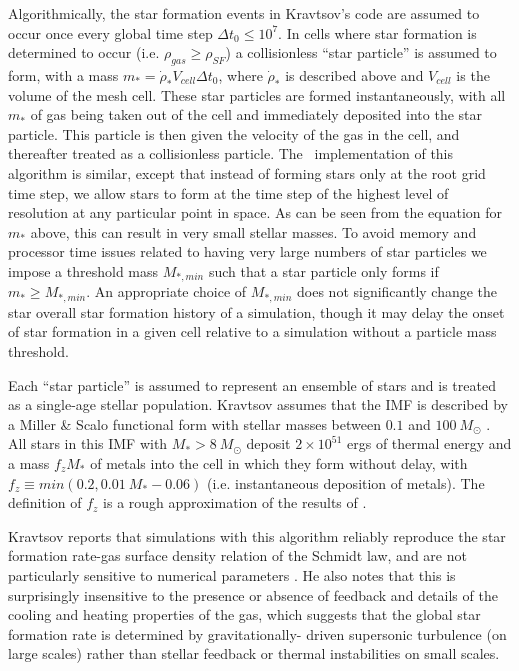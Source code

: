 Algorithmically, the star formation events in Kravtsov's code
are assumed to occur once every global time step 
$\Delta t_0 \leq 10^7$.  In cells where star formation is
determined to occur (i.e. $\rho_{gas} \geq \rho_{SF}$) a
collisionless ``star particle'' is assumed to form, with a 
mass $m_* = \dot{\rho}_* V_{cell} \Delta t_0$, where
$\dot{\rho}_*$ is described above and $V_{cell}$ is the 
volume of the mesh cell.  These star particles are
formed instantaneously, with all $m_*$ of gas being
taken out of the cell and immediately deposited into the
star particle.  This particle is then given the velocity
of the gas in the cell, and thereafter treated as a 
collisionless particle.  The \enzo\ implementation
of this algorithm is similar, except that instead of 
forming stars only at the root grid time step, we allow 
stars to form at the time step of the highest level of
resolution at any particular point in space.  As can be seen
from the equation for $m_*$ above, this can result in very 
small stellar masses.  To avoid memory and processor time
issues related to having very large numbers of star particles
we impose a threshold mass $M_{*,min}$ such that a star
particle only forms if $m_* \geq M_{*,min}$.  An
appropriate choice of $M_{*,min}$ does not significantly 
change the star overall star formation history of a 
simulation, though it may delay the onset of star formation 
in a given cell relative to a simulation without a particle mass
threshold.

Each ``star particle'' is assumed to represent an ensemble
of stars and is treated as a single-age stellar population.
Kravtsov assumes that the IMF is described by a
Miller \& Scalo functional form with stellar masses between
$0.1$ and $100~M_\odot$ \citep{1979ApJS...41..513M}.  All stars in this
IMF with $M_* > 8~M_\odot$ deposit $2 \times 10^{51}$ ergs of
thermal energy and a mass $f_z M_*$ of metals into the
cell in which they form without delay, with
$f_z \equiv min(0.2, 0.01~M_*-0.06)$ (i.e. instantaneous
deposition of metals).  The definition of $f_z$ is a rough
approximation of the results of 
\citet{1995ApJS..101..181W}.

Kravtsov reports that simulations with this algorithm
reliably reproduce the star formation rate-gas surface
density relation of the Schmidt law, and are not particularly
sensitive to numerical parameters \citep{2003ApJ...590L...1K}.
He also notes that this is surprisingly insensitive to
the presence or absence of feedback and details of the cooling
and heating properties of the gas, which suggests that the
global star formation rate is determined by gravitationally-
driven supersonic turbulence (on large scales)
rather than stellar feedback or thermal instabilities on small 
scales.

